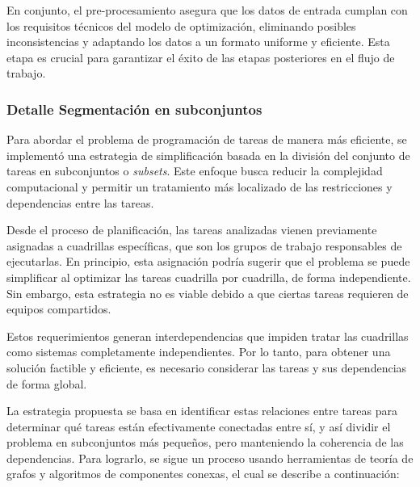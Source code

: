 \documentclass{article}
\begin{document}
En conjunto, el pre-procesamiento asegura que los datos de entrada cumplan con los requisitos técnicos del modelo de optimización, eliminando posibles inconsistencias y adaptando los datos a un formato uniforme y eficiente. Esta etapa es crucial para garantizar el éxito de las etapas posteriores en el flujo de trabajo.


\subsubsection{Detalle Segmentación en subconjuntos}

Para abordar el problema de programación de tareas de manera más eficiente, se implementó una estrategia de simplificación basada en la división del conjunto de tareas en subconjuntos o \textit{subsets}. Este enfoque busca reducir la complejidad computacional y permitir un tratamiento más localizado de las restricciones y dependencias entre las tareas.

Desde el proceso de planificación, las tareas analizadas vienen previamente asignadas a cuadrillas específicas, que son los grupos de trabajo responsables de ejecutarlas. En principio, esta asignación podría sugerir que el problema se puede simplificar al optimizar las tareas cuadrilla por cuadrilla, de forma independiente. Sin embargo, esta estrategia no es viable debido a que ciertas tareas requieren de equipos compartidos. 

Estos requerimientos generan interdependencias que impiden tratar las cuadrillas como sistemas completamente independientes. Por lo tanto, para obtener una solución factible y eficiente, es necesario considerar las tareas y sus dependencias de forma global.

La estrategia propuesta se basa en identificar estas relaciones entre tareas para determinar qué tareas están efectivamente conectadas entre sí, y así dividir el problema en subconjuntos más pequeños, pero manteniendo la coherencia de las dependencias. Para lograrlo, se sigue un proceso usando herramientas de teoría de grafos y algoritmos de componentes conexas, el cual se describe a continuación:
\end{document}

